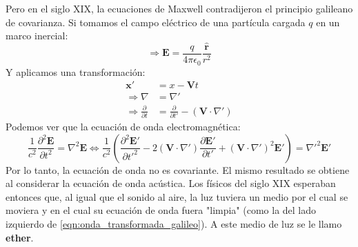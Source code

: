 \documentclass[]{article}
\numberwithin{equation}{section}
\begin{document}
Pero en el siglo XIX, la ecuaciones de Maxwell contradijeron el principio galileano de covarianza. Si tomamos el campo eléctrico de una partícula cargada $q$ en un marco inercial:
\begin{equation*}
	\Rightarrow  \mathbf{E} = \frac{q}{4\pi\epsilon_0}\frac{\mathbf{\hat{r}}}{r^2}
\end{equation*}
Y aplicamos una transformación:
\begin{align*}
	\mathbf{x}' &= x - \mathbf{V}t \\
	\Rightarrow \nabla &= \nabla' \\
	\Rightarrow \frac{\partial}{\partial t} &= \frac{\partial}{\partial t'} - (\mathbf{V}\cdot\nabla')
\end{align*}
Podemos ver que la ecuación de onda electromagnética:
\begin{equation}
	\frac{1}{c^2}\frac{\partial^2\mathbf{E}}{\partial t^2} = \nabla^2\mathbf{E} \Leftrightarrow \frac{1}{c^2}\left(\frac{\partial^2\mathbf{E}'}{\partial t'^2} - 2(\mathbf{V}\cdot\nabla')\frac{\partial\mathbf{E}'}{\partial t'} + (\mathbf{V}\cdot\nabla')^2\mathbf{E}'\right)  = \nabla'^2\mathbf{E}'
	\label{eqn:onda_transformada_galileo}
\end{equation}
Por lo tanto, la ecuación de onda no es covariante. El mismo resultado se obtiene al considerar la ecuación de onda acústica. Los físicos del siglo XIX esperaban entonces que, al igual que el sonido al aire, la luz tuviera un medio por el cual se moviera y en el cual su ecuación de onda fuera "limpia" (como la del lado izquierdo de \ref{eqn:onda_transformada_galileo}). A este medio de luz se le llamo \textbf{ether}.
\end{document}
